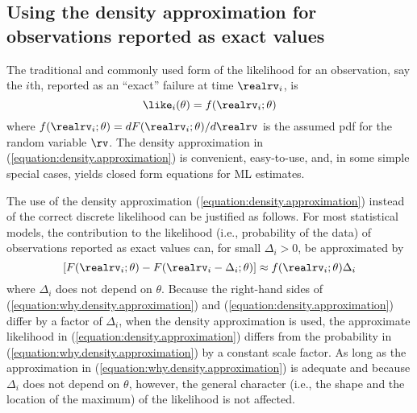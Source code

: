 \subsection{Using the density approximation for 
observations reported as exact values}

The traditional and commonly used form of the likelihood for an
observation, say the $i$th,
reported as an ``exact'' failure
at time $\realrv_{i}$, is
\begin{equation}
\label{equation:density.approximation}
\like_{i}(\theta)=f(\realrv_{i};\theta)
\end{equation}
where $f(\realrv_{i};\theta)= dF(\realrv_{i};\theta)/d\realrv$ is the
assumed pdf for the random variable
$\rv$.  The density approximation in
(\ref{equation:density.approximation}) is convenient, easy-to-use,
and, in some simple special cases, yields closed
form equations for ML estimates.

The use of the density approximation
(\ref{equation:density.approximation})
instead of the correct discrete likelihood can be
justified as follows. For most statistical models, the contribution to
the likelihood (i.e., probability of the data) of observations
reported as exact values can, for small $\Delta_{i}>0$, be
approximated by
\begin{equation}
\label{equation:why.density.approximation}
        [F(\realrv_{i};\theta)-
        F(\realrv_{i}-\Delta_{i};\theta)]
        \approx f(\realrv_{i};\theta)\Delta_{i}
\end{equation}
where $\Delta_{i}$ does not depend on $\theta$.  Because the
right-hand sides of (\ref{equation:why.density.approximation}) and
(\ref{equation:density.approximation}) differ by a factor of
$\Delta_{i}$, when the density approximation is used, the
approximate likelihood in (\ref{equation:density.approximation})
differs from the probability in
(\ref{equation:why.density.approximation}) by a constant scale
factor.  As long as the approximation in
(\ref{equation:why.density.approximation}) is adequate and because
$\Delta_{i}$ does not depend on $\theta$, however, the general
character (i.e., the shape and the location of the maximum) of the
likelihood is not affected.

